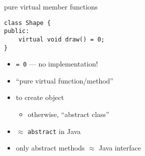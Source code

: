 \begin{frame}[fragile,label=pureVirtual]{pure virtual member functions}
\lstset{language=C++,style=small}
\begin{lstlisting}
class Shape {
public:
    virtual void draw() = 0;
}
\end{lstlisting}
\begin{itemize}
\item \texttt{= 0} --- no implementation!
\item ``pure virtual function/method''
\item {} to create object
    \begin{itemize}
    \item otherwise, ``abstract class''
    \end{itemize}
\item $\approx$ \texttt{abstract} in Java
\item only abstract methods $\approx$ Java interface
\end{itemize}
\end{frame}
